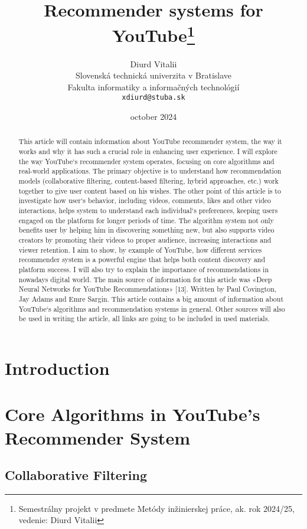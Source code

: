 \documentclass[10pt,twoside,slovak,a4paper]{coursepaper}
\title{Recommender systems for YouTube\thanks{Semestrálny projekt v predmete Metódy inžinierskej práce, ak. rok 2024/25, vedenie: Diurd Vitalii}}
\author{Diurd Vitalii\\[2pt]
	{\small Slovenská technická univerzita v Bratislave}\\
	{\small Fakulta informatiky a informačných technológií}\\
	{\small \texttt{xdiurd@stuba.sk}}
	}
\date{\small october 2024} %
\begin{document}
\maketitle

\begin{abstract}
This article will contain information about YouTube recommender system, the way it works and why it has such a crucial role in enhancing user experience. I will explore the way YouTube`s recommender system operates, focusing on core algorithms and real-world applications. The primary objective is to understand how recommendation models (collaborative filtering, content-based filtering, hybrid approaches, etc.) work together to give user content based on his wishes. The other point of this article is to investigate how user`s behavior, including videos, comments, likes and other video interactions, helps system to understand each individual`s preferences, keeping users engaged on the platform for longer periods of time. The algorithm system not only benefits user by helping him in discovering something new, but also supports video creators by promoting their videos to proper audience, increasing interactions and viewer retention. I aim to show, by example of YouTube,   how different services recommender system is a powerful engine that helps both content discovery and platform success. I will also try to explain the importance of recommendations in nowadays digital world. The main source of information for this article was «Deep Neural Networks for YouTube Recommendations» [13].  Written by Paul Covington, Jay Adams and Emre Sargin. This article contains a big amount of information about YouTube`s algorithms and recommendation systems in general. Other sources will also be used in writing the article, all links are going to be included in used materials.
\end{abstract}



\section{Introduction} \label{intro}
\section{Core Algorithms in YouTube’s Recommender System} \label{core}
\subsection{Collaborative Filtering} \label{core:collaborative}
\end{document}
